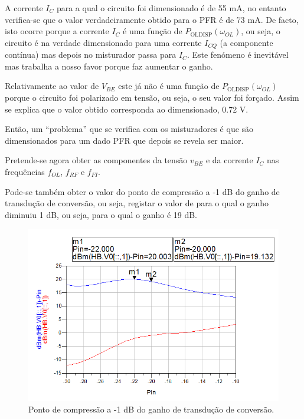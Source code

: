 \documentclass[11pt]{article}
\numberwithin{equation}{section}
\begin{document}
A corrente $I_{C}$ para a qual o circuito foi dimensionado é de 55 mA, no entanto verifica-se que o valor verdadeiramente obtido para o PFR é de 73 mA. De facto, isto ocorre porque a corrente $I_{C}$ é uma função de $ P_{\text{OLDISP}}\left(\omega_{OL}\right) $, ou seja, o circuito é na verdade dimensionado para uma corrente $I_{CQ}$ (a componente contínua) mas depois no misturador passa para $I_{C}$. Este fenómeno é inevitável mas trabalha a nosso favor porque faz aumentar o ganho.

Relativamente ao valor de $V_{BE}$ este já não é uma função de $ P_{\text{OLDISP}}\left(\omega_{OL}\right) $ porque o circuito foi polarizado em tensão, ou seja, o seu valor foi forçado. Assim se explica que o valor obtido corresponda ao dimensionado, 0.72 V.

Então, um ``problema'' que se verifica com os misturadores é que são dimensionados para um dado PFR que depois se revela ser maior.

Pretende-se agora obter as componentes da tensão $v_{BE}$ e da corrente $I_{C}$ nas frequências $f_{OL}$, $f_{RF}$ e $f_{FI}$. 

Pode-se também obter o valor do ponto de compressão a -1 dB do ganho de transdução de conversão, ou seja, registar o valor de  para o qual o ganho diminuiu 1 dB, ou seja, para o qual o ganho é 19 dB. 

\begin{figure}[h]
\centering
\includegraphics[keepaspectratio=true, scale=0.45]{exps/Compression}
\vspace{-0.5em}
\caption{Ponto de compressão a -1 dB do ganho de transdução de conversão.}
\vspace{-0.8em}
\label{fig:Compressao}
\end{figure}
\end{document}
